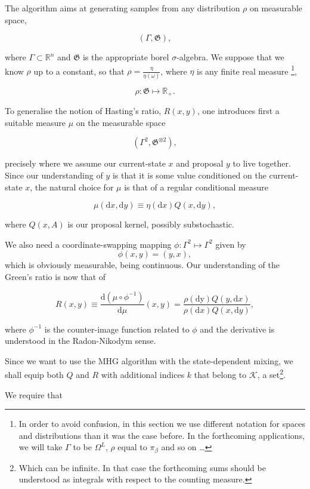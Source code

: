 The algorithm aims at generating samples from any distribution $\rho$ on measurable space,

	$$(\Gamma, \mathfrak{G}),$$

where $\Gamma \subset \mathbb{R}^n$ and $\mathfrak{G}$ is the appropriate borel $\sigma$-algebra. We suppose that we know $\rho$ up to a constant, so that $\rho = \frac{\eta}{\eta(\omega)}$, where $\eta$ is any finite real measure \footnote{In order to avoid confusion, in this section we use different notation for spaces and distributions than it was the case before. In the forthcoming applications, we will take $\Gamma$ to be $\Omega^L$, $\rho$ equal to $\pi_\beta$ and so on \dots}, 

	$$\rho: \mathfrak{G} \mapsto \mathbb{R}_{+}.$$  

To generalise the notion of Hasting's ratio, $R(x,y)$, one introduces first a suitable measure $\mu$ on the measurable space 

	$$(\Gamma^2, \mathfrak{G}^{\otimes 2}),$$ 

precisely where we assume our current-state $x$ and proposal $y$ to live together. Since our understanding of $y$ is that it is some value conditioned on the current-state $x$, the natural choice for $\mu$ is that of a regular conditional measure

	$$\mu(\mathrm{d }x, \mathrm{d }y)   \equiv \eta (\mathrm{d} x) Q(x, \mathrm{d } y),$$

where $Q(x,A)$ is our proposal kernel, possibly substochastic.
 
 
We also need a coordinate-swapping mapping $\phi: \Gamma^2 \mapsto \Gamma^2$ given by $$\phi(x,y) = (y,x),$$ which is obviously measurable, being continuous. Our understanding of the Green's ratio is now that of

	$$R(x,y) \equiv	\frac{\mathrm{d }(\mu \circ \phi^{-1})}{\mathrm{d }\mu} (x,y) = \frac{\rho(\mathrm{d y} )Q(y, \mathrm{d }x)}{\rho(\mathrm{d }x) Q(x, \mathrm{d }y)},$$

where $\phi^{-1}$ is the counter-image function related to $\phi$ and the derivative is understood in the Radon-Nikodym sense. 

Since we want to use the MHG algorithm with the state-dependent mixing, we shall equip both $Q$ and $R$ with additional indices $k$ that belong to $\mathcal{K}$, a set\footnote{Which can be infinite. In that case the forthcoming sums should be understood as integrals with respect to the counting measure.}.  

We require that

